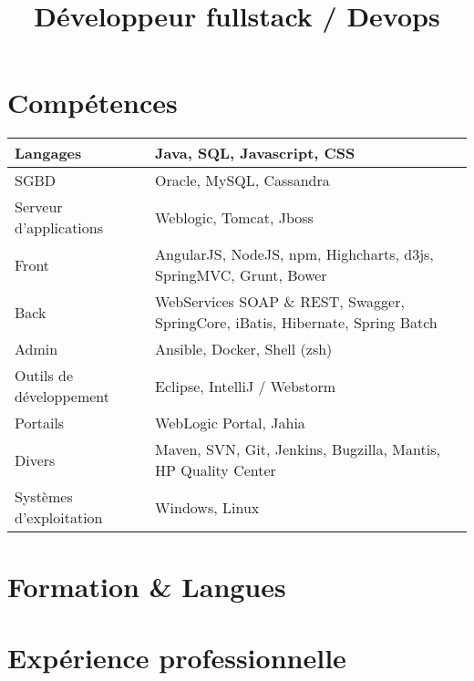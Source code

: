 \documentclass[11pt,a4paper,sans]{moderncv}        %
\title{Développeur fullstack / Devops}                               %
\begin{document}
\makecvtitle
\section{Compétences}
\begin{tabular}[t]{| p{5cm} | p{12cm} |}
  \hline  
  Langages & Java, SQL, Javascript, CSS \\
  \hline  
  SGBD & Oracle, MySQL, Cassandra \\
  \hline
  Serveur d’applications & Weblogic, Tomcat, Jboss \\
  \hline  
  Front & AngularJS, NodeJS, npm, Highcharts, d3js, SpringMVC, Grunt, Bower \\
  \hline 
  Back & WebServices SOAP \& REST, Swagger, SpringCore, iBatis, Hibernate, Spring Batch \\
  \hline
  Admin & Ansible, Docker, Shell (zsh) \\
  \hline
   Outils de développement & Eclipse, IntelliJ / Webstorm \\
  \hline  
  Portails & WebLogic Portal, Jahia \\
  \hline  
  Divers & Maven, SVN, Git, Jenkins, Bugzilla, Mantis, HP Quality Center \\
  \hline
  Systèmes d’exploitation & Windows, Linux \\
  \hline
\end{tabular}

\section{Formation \& Langues}


\section{Expérience professionnelle}
\end{document}
